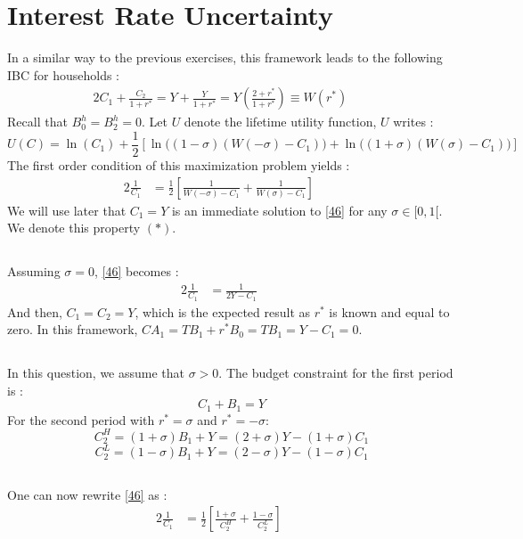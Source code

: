 \documentclass{article}
\begin{document}
\section{Interest Rate Uncertainty}
In a similar way to the previous exercises, this framework leads to the following IBC for households :
\begin{alignat}{2}
    C_1 + \frac{C_2}{1+r^*}  = Y + \frac{Y}{1+r^*} = Y\left(\frac{2+r^*}{1+r^*}\right) \equiv W(r^*) &\quad
\end{alignat}
Recall that $B_0^h = B_2^h = 0$.\newline
Let $U$ denote the lifetime utility function, $U$ writes : 
\begin{equation}
    U(C)  = \ln (C_1) + \frac{1}{2} \left[ \ln \Big((1-\sigma)(W(-\sigma)-C_1)\Big) + \ln \Big((1+\sigma)(W(\sigma)-C_1)\Big)\right]
\end{equation}
The first order condition of this maximization problem yields :
\begin{alignat}{2}
    \frac{1}{C_1}  &= \frac{1}{2}\left[ \frac{1}{W(-\sigma)-C_1} + \frac{1}{W(\sigma)- C_1}  \right]   &\quad\
    \label{46}
\end{alignat}
We will use later that $C_1 = Y$ is an immediate solution to \eqref{46} for any $\sigma \in [0, 1[$. We denote this property $(*)$. 
\subsection{}
Assuming $\sigma = 0$, \eqref{46} becomes :
\begin{alignat}{2}
    \frac{1}{C_1}  &= \frac{1}{2Y- C_1}   &\quad\
    \label{47}
\end{alignat}
And then, $C_1 = C_2 = Y$, which is the expected result as $r^*$ is known and equal to zero. In this framework, $CA_1 = TB_1 + r^* B_0 = TB_1 = Y - C_1 = 0$.
\subsection{}
In this question, we assume that $\sigma > 0$.\newline 
The budget constraint for the first period is : 
$$C_1 + B_1 = Y$$
For the second period with $r^* = \sigma$ and $r^* = -\sigma$: 
$$C_2^H = (1+\sigma) B_1 + Y = (2+\sigma)Y - (1+\sigma)C_1$$
$$C_2^L = (1-\sigma) B_1 + Y = (2-\sigma)Y - (1-\sigma)C_1$$
\subsection{}
One can now rewrite \eqref{46} as : 
\begin{alignat}{2}
    \frac{1}{C_1}  &= \frac{1}{2}\left[ \frac{1+\sigma}{C_2^H} + \frac{1-\sigma}{C_2^L}  \right]   &\quad\
\end{alignat}
\end{document}
